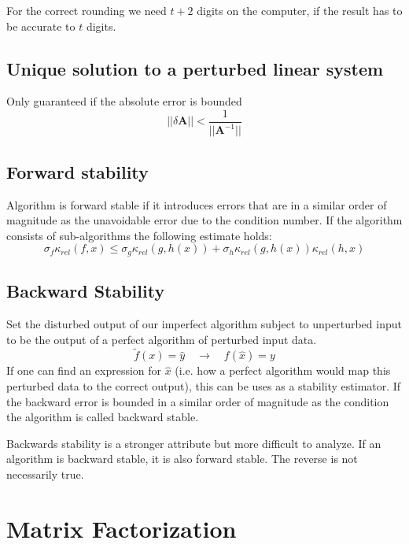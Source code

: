 \documentclass[
    a4paper,
    11pt
]{article}
\begin{document}
For the correct rounding we need $t+2$ digits on the computer, if the result has
to be accurate to $t$ digits.

\subsection{Unique solution to a perturbed linear system}

Only guaranteed if the absolute error is bounded
\begin{equation}
    ||\delta \mathbf{A} || < \frac{1}{||\mathbf{A}^{-1}||}
\end{equation}

\subsection{Forward stability}
Algorithm is forward stable if it introduces errors that are in a similar order
of magnitude as the unavoidable error due to the condition number. If the
algorithm consists of sub-algorithms the following estimate holds:
\begin{equation}
    \sigma_f \kappa_{rel}(f, x) \leq \sigma_g \kappa_{rel}(g, h(x)) + \sigma_h
    \kappa_{rel}(g, h(x)) \kappa_{rel}(h, x)
\end{equation}

\subsection{Backward Stability}
Set the disturbed output of our imperfect algorithm subject to unperturbed input
to be the output of a perfect algorithm of perturbed input data.
\begin{equation}
    \tilde{f}(x) = \hat{y} \quad \to \quad f(\hat{x}) = y
\end{equation}
If one can find an expression for $\hat{x}$ (i.e. how a perfect algorithm would
map this perturbed data to the correct output), this can be uses as a stability
estimator. If the backward error is bounded in a similar order of magnitude as
the condition the algorithm is called backward stable.

Backwards stability is a stronger attribute but more difficult to analyze. If an
algorithm is backward stable, it is also forward stable. The reverse is not
necessarily true.


\section{Matrix Factorization}
\end{document}
